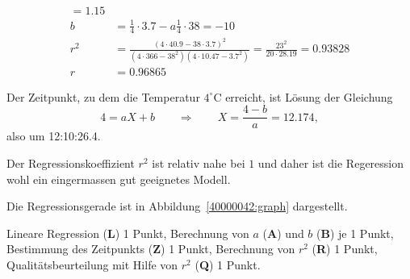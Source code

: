 \begin{loesung}
\begin{align*}
=
1.15
\\
b
&=
\frac14\cdot 3.7 -a\frac14\cdot 38
=
-10
\\
r^2
&=
\frac{(4\cdot 40.9 - 38\cdot 3.7)^2}{
(4\cdot 366-38^2)(4\cdot 10.47-3.7^2)
}
=
\frac{23^2}{20\cdot 28.19}
=
0.93828
\\
r&=0.96865
\end{align*}
\begin{teilaufgaben}
\item
Der Zeitpunkt, zu dem die Temperatur $4^\circ\text{C}$
erreicht, ist Lösung der Gleichung
\[
4=aX+b
\qquad\Rightarrow\qquad
X
=
\frac{4-b}{a}
=
12.174,
\]
also um 12:10:26.4.
\item
Der Regressionskoeffizient $r^2$ ist relativ nahe bei $1$ und daher
ist die Regeression wohl ein eingermassen gut geeignetes Modell.
\end{teilaufgaben}
Die Regressionsgerade ist in Abbildung~\ref{40000042:graph} dargestellt.
\end{loesung}

\begin{bewertung}
Lineare Regression ({\bf L}) 1 Punkt,
Berechnung von $a$ ({\bf A}) und $b$ ({\bf B}) je 1 Punkt,
Bestimmung des Zeitpunkts ({\bf Z}) 1 Punkt,
Berechnung von $r^2$ ({\bf R}) 1 Punkt,
Qualitätsbeurteilung mit Hilfe von $r^2$ ({\bf Q}) 1 Punkt.
\end{bewertung}
